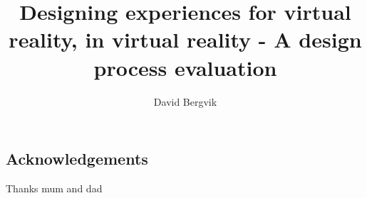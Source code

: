 \documentclass[a4paper,11pt,twoside]{report}
\title{Designing experiences for virtual reality, in virtual reality - A design process evaluation}%
\author{David Bergvik}
\begin{document}
\maketitle


\begin{center}
\section*{Acknowledgements}
Thanks mum and dad 
\end{center}

\clearpage

\end{document}

